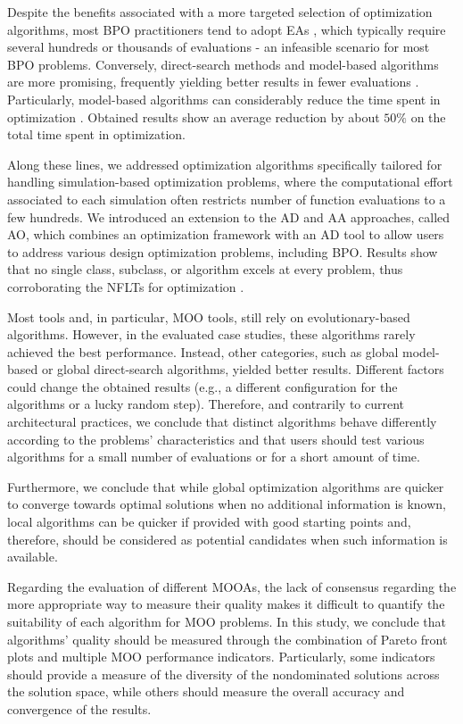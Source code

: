 Despite the benefits associated with a more targeted selection of optimization algorithms, most \ac{BPO} practitioners tend to adopt \acp{EA} \cite{Evins2013, Nguyen2014}, which typically require several hundreds or thousands of evaluations - an infeasible scenario for most \ac{BPO} problems. Conversely, direct-search methods and model-based algorithms are more promising, frequently yielding better results in fewer evaluations \cite{Waibel2018}. Particularly, model-based algorithms can considerably reduce the time spent in optimization \cite{Wortmann2017GABESTCHOICE}. Obtained results show an average reduction by about $50\%$ on the total time spent in optimization.

Along these lines, we addressed optimization algorithms specifically tailored for handling simulation-based optimization problems, where the computational effort associated to each simulation often restricts number of function evaluations to a few hundreds. We introduced an extension to the \ac{AD} and \ac{AA} approaches, called \ac{AO}, which combines an optimization framework with an \ac{AD} tool to allow users to address various design optimization problems, including \ac{BPO}. Results show that no single class, subclass, or algorithm excels at every problem, thus corroborating the \acp{NFLT} for optimization \cite{Wolpert1997NFLT}. 

Most tools and, in particular, \ac{MOO} tools, still rely on evolutionary-based algorithms. However, in the evaluated case studies, these algorithms rarely achieved the best performance. Instead, other categories, such as global model-based or global direct-search algorithms, yielded better results. Different factors could change the obtained results (e.g., a different configuration for the algorithms or a lucky random step). Therefore, and contrarily to current architectural practices, we conclude that distinct algorithms behave differently according to the problems' characteristics and that users should test various algorithms for a small number of evaluations or for a short amount of time. 

Furthermore, we conclude that while global optimization algorithms are quicker to converge towards optimal solutions when no additional information is known, local algorithms can be quicker if provided with good starting points and, therefore, should be considered as potential candidates when such information is available.

Regarding the evaluation of different \acp{MOOA}, the lack of consensus regarding the more appropriate way to measure their quality makes it difficult to quantify the suitability of each algorithm for \ac{MOO} problems. In this study, we conclude that algorithms' quality should be measured through the combination of Pareto front plots and multiple \ac{MOO} performance indicators. Particularly, some indicators should provide a measure of the diversity of the nondominated solutions across the solution space, while others should measure the overall accuracy and convergence of the results.

